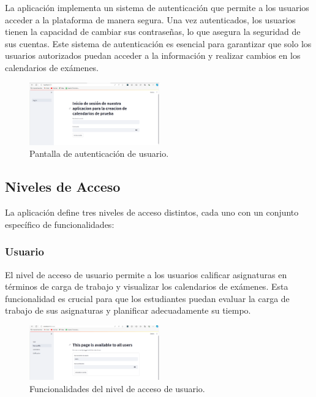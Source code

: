 \documentclass{article}
\begin{document}
La aplicación implementa un sistema de autenticación  que permite a los usuarios acceder a la plataforma de manera segura. Una vez autenticados, los usuarios tienen la capacidad de cambiar sus contraseñas, lo que asegura la seguridad de sus cuentas. Este sistema de autenticación es esencial para garantizar que solo los usuarios autorizados puedan acceder a la información y realizar cambios en los calendarios de exámenes.

\begin{figure}[h!] \centering \includegraphics[width=0.5\textwidth]{autenticacion_usuario.png} \caption{Pantalla de autenticación de usuario.} \end{figure}

\subsection{Niveles de Acceso}

La aplicación define tres niveles de acceso distintos, cada uno con un conjunto específico de funcionalidades:

\subsubsection{Usuario}

El nivel de acceso de usuario permite a los usuarios calificar asignaturas en términos de carga de trabajo y visualizar los calendarios de exámenes. Esta funcionalidad es crucial para que los estudiantes puedan evaluar la carga de trabajo de sus asignaturas y planificar adecuadamente su tiempo.

\begin{figure}[h!] \centering \includegraphics[width=0.5\textwidth]{nivel_usuario.png} \caption{Funcionalidades del nivel de acceso de usuario.} \end{figure}
\end{document}

